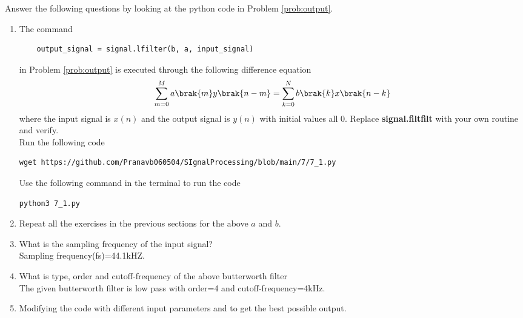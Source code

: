 \documentclass[journal,12pt,twocolumn]{IEEEtran}
\renewcommand\thesection{\arabic{section}}
\begin{document}
Answer the following questions by looking at the python code in Problem \ref{prob:output}.
\begin{enumerate}[label=\thesection.\arabic*]
\item
The command
\begin{lstlisting}
	output_signal = signal.lfilter(b, a, input_signal)
	\end{lstlisting}
in Problem \ref{prob:output} is executed through the following difference equation
\begin{equation}
\label{eq:iir_filter_gen}
 \sum _{m=0}^{M}a\brak{m}y\brak{n-m}=\sum _{k=0}^{N}b\brak{k}x\brak{n-k}
\end{equation}
%
where the input signal is $x(n)$ and the output signal is $y(n)$ with initial values all 0. Replace
\textbf{signal.filtfilt} with your own routine and verify.\\
\solution
Run the following code 
\begin{lstlisting}
wget https://github.com/Pranavb060504/SIgnalProcessing/blob/main/7/7_1.py
\end{lstlisting}
Use the following command in the terminal to run the code
\begin{lstlisting}
python3 7_1.py
\end{lstlisting}
%
\item Repeat all the exercises in the previous sections for the above $a$ and $b$.

\item What is the sampling frequency of the input signal?
\\
\solution
Sampling frequency(fs)=44.1kHZ.
\item
What is type, order and  cutoff-frequency of the above butterworth filter
\\
\solution
The given butterworth filter is low pass with order=4 and cutoff-frequency=4kHz.
%
\item
Modifying the code with different input parameters and to get the best possible output.
%
\end{enumerate}
\end{document}
